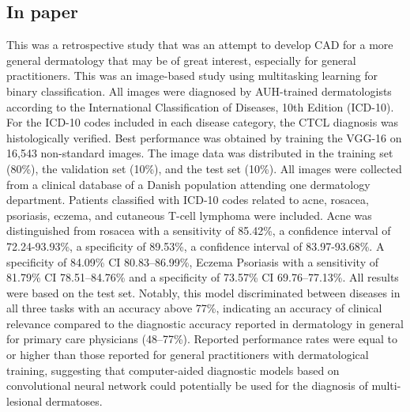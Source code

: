 \documentclass{article}
\begin{document}
\subsection{In paper\cite{r1} } This was a retrospective study that was an attempt to develop CAD for a more general dermatology that may be of great interest, especially for general practitioners. This was an image-based study using multitasking learning for binary classification.
All images were diagnosed by AUH-trained dermatologists according to the International Classification of Diseases, 10th Edition (ICD-10).
For the ICD-10 codes included in each disease category, the CTCL diagnosis was histologically verified. 
Best performance was obtained by training the VGG-16 on 16,543 non-standard images. The image data was distributed in the training set (80\%), the validation set (10\%), and the test set (10\%).
All images were collected from a clinical database of a Danish population attending one dermatology department. Patients classified with ICD-10 codes related to acne, rosacea, psoriasis, eczema, and cutaneous T-cell lymphoma were included.
Acne was distinguished from rosacea with a sensitivity of 85.42\%, a confidence interval of 72.24-93.93\%, a specificity of 89.53\%, a confidence interval of 83.97-93.68\%. A specificity of 84.09\% CI 80.83–86.99\%, Eczema Psoriasis with a sensitivity of 81.79\% CI 78.51–84.76\% and a specificity of 73.57\% CI 69.76–77.13\%. All results were based on the test set. Notably, this model discriminated between diseases in all three tasks with an accuracy above 77\%, indicating an accuracy of clinical relevance compared to the diagnostic accuracy reported in dermatology in general for primary care physicians (48–77\%).
Reported performance rates were equal to or higher than those reported for general practitioners with dermatological training, suggesting that computer-aided diagnostic models based on convolutional neural network could potentially be used for the diagnosis of multi-lesional dermatoses.
\end{document}
